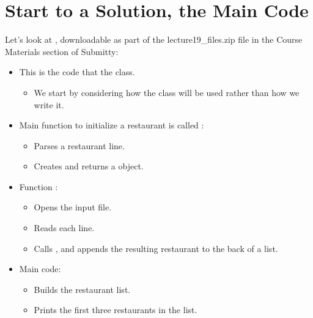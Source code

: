 \documentclass[letterpaper,10pt,english]{sphinxmanual}
\begin{document}
\section{Start to a Solution, the Main Code}
\label{\detokenize{lecture_notes/lec19_classes2:start-to-a-solution-the-main-code}}
Let’s look at , downloadable as part
of the lecture19\_files.zip file in the Course Materials section of Submitty:
\begin{itemize}
\item {} 
This is the code that  the  class.
\begin{itemize}
\item {} 
We start by considering how the class will be used rather than
how we write it.

\end{itemize}

\item {} 
Main function to initialize a restaurant is called
:
\begin{itemize}
\item {} 
Parses a restaurant line.

\item {} 
Creates and returns a  object.

\end{itemize}

\item {} 
Function :
\begin{itemize}
\item {} 
Opens the input file.

\item {} 
Reads each line.

\item {} 
Calls , and appends the resulting
restaurant to the back of a list.

\end{itemize}

\item {} 
Main code:
\begin{itemize}
\item {} 
Builds the restaurant list.

\item {} 
Prints the first three restaurants in the list.


\end{itemize}
\end{itemize}
\end{document}
